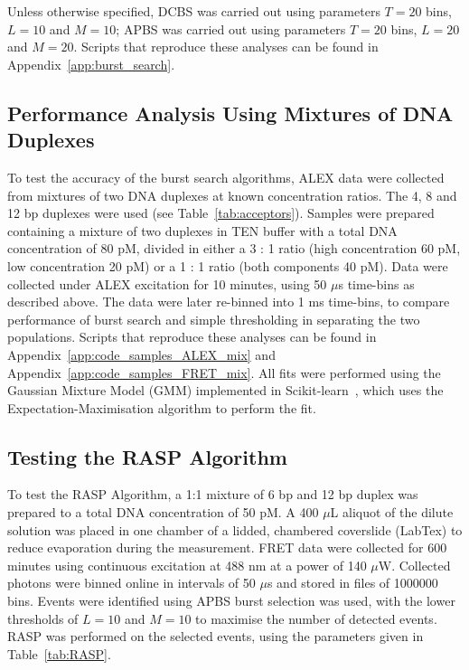 Unless otherwise specified, DCBS was carried out using parameters $T = 20$ bins, $L = 10$ and $M = 10$; APBS was carried out using parameters $T = 20$ bins, $L = 20$ and $M = 20$. Scripts that reproduce these analyses can be found in Appendix~\ref{app:burst_search}.

\subsection{Performance Analysis Using Mixtures of DNA Duplexes}
To test the accuracy of the burst search algorithms, ALEX data were collected from mixtures of two DNA duplexes at known concentration ratios. The 4, 8 and 12 bp duplexes were used (see Table~\ref{tab:acceptors}). Samples were prepared containing a mixture of two duplexes in TEN buffer with a total DNA concentration of 80 pM, divided in either a 3 : 1 ratio (high concentration 60 pM, low concentration 20 pM) or a 1 : 1 ratio (both components 40 pM). Data were collected under ALEX excitation for 10 minutes, using 50 $\mu$s time-bins as described above. The data were later re-binned into 1 ms time-bins, to compare performance of burst search and simple thresholding in separating the two populations. Scripts that reproduce these analyses can be found in Appendix~\ref{app:code_samples_ALEX_mix} and Appendix~\ref{app:code_samples_FRET_mix}. All fits were performed using the Gaussian Mixture Model (GMM) implemented in Scikit-learn~\cite{scikit-learn}, which uses the Expectation-Maximisation algorithm to perform the fit.  


\subsection{Testing the RASP Algorithm}
To test the RASP Algorithm, a 1:1 mixture of 6 bp and 12 bp duplex was prepared to a total DNA concentration of 50 pM. A 400 $\mu$L aliquot of the dilute solution was placed in one chamber of a lidded, chambered coverslide (LabTex) to reduce evaporation during the measurement. FRET data were collected for 600 minutes using continuous excitation at 488 nm at a power of 140 $\mu$W. Collected photons were binned online in intervals of 50 $\mu$s and stored in files of 1000000 bins. Events were identified using APBS burst selection was used, with the lower thresholds of $L = 10$ and $M = 10$ to maximise the number of detected events. RASP was performed on the selected events, using the parameters given in Table~\ref{tab:RASP}. 

